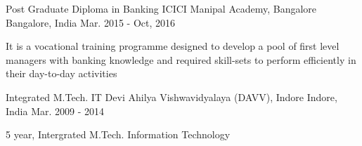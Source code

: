 \begin{cventries}
  \cventry
    {Post Graduate Diploma in Banking}
    {ICICI Manipal Academy, Bangalore}
    {Bangalore, India}
    {Mar. 2015 - Oct, 2016}
    {
      \begin{cvitems}
        \item {It is a vocational training programme designed to develop a pool of first level managers with banking knowledge and required skill-sets to perform efficiently in their day-to-day activities}
      \end{cvitems}
    }
  \cventry
    {Integrated M.Tech. IT}
    {Devi Ahilya Vishwavidyalaya (DAVV), Indore}
    {Indore, India}
    {Mar. 2009 - 2014}
    {
      \begin{cvitems}
        \item {5 year, Intergrated M.Tech. Information Technology}
      \end{cvitems}
    }
\end{cventries}
